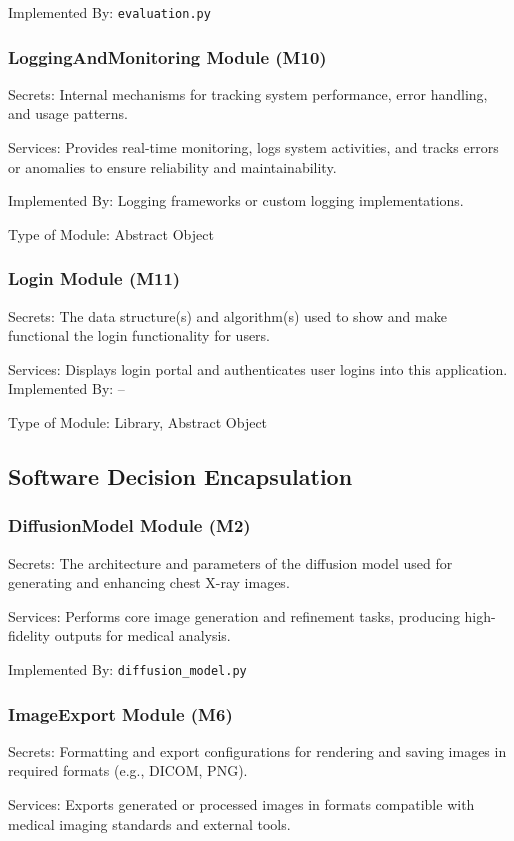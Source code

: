 \documentclass[12pt, titlepage]{article}
\begin{document}
Implemented By: \verb|evaluation.py|

\subsubsection{LoggingAndMonitoring Module (M10)}
Secrets: Internal mechanisms for tracking system performance, error handling, and usage patterns.

Services: Provides real-time monitoring, logs system activities, and tracks errors or anomalies to ensure reliability and maintainability.

Implemented By: Logging frameworks or custom logging implementations.

Type of Module: Abstract Object

\subsubsection{Login Module (M11)}
Secrets: The data structure(s) and algorithm(s) used to show and make functional the login functionality for users.

Services: Displays login portal and authenticates user logins into this application.
Implemented By: –

Type of Module: Library, Abstract Object

\subsection{Software Decision Encapsulation}

\subsubsection{DiffusionModel Module (M2)}
Secrets: The architecture and parameters of the diffusion model used for generating and enhancing chest X-ray images.

Services: Performs core image generation and refinement tasks, producing high-fidelity outputs for medical analysis.

Implemented By: \verb|diffusion_model.py|

\subsubsection{ImageExport Module (M6)}
Secrets: Formatting and export configurations for rendering and saving images in required formats (e.g., DICOM, PNG).

Services: Exports generated or processed images in formats compatible with medical imaging standards and external tools.
\end{document}
